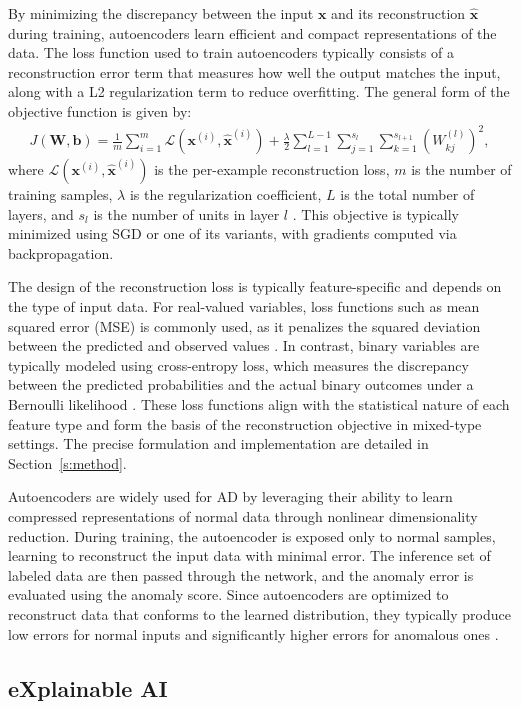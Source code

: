 By minimizing the discrepancy between the input $\mathbf{x}$ and its reconstruction $\hat{\mathbf{x}}$ during training, autoencoders learn efficient and compact representations of the data. The loss function used to train autoencoders typically consists of a reconstruction error term that measures how well the output matches the input, along with a L2 regularization term to reduce overfitting. The general form of the objective function is given by:
\begin{align} \label{eq:loss_func}
J(\mathbf{W}, \mathbf{b}) = \frac{1}{m} \sum_{i=1}^{m} \mathcal{L}(\mathbf{x}^{(i)}, \hat{\mathbf{x}}^{(i)}) + \frac{\lambda}{2} \sum_{l=1}^{L-1} \sum_{j=1}^{s_l} \sum_{k=1}^{s_{l+1}} \left( W_{kj}^{(l)} \right)^2,
\end{align}
where $\mathcal{L}(\mathbf{x}^{(i)}, \hat{\mathbf{x}}^{(i)})$ is the per-example reconstruction loss, $m$ is the number of training samples, $\lambda$ is the regularization coefficient, $L$ is the total number of layers, and $s_l$ is the number of units in layer $l$ \citep{sakurada2014anomaly}. This objective is typically minimized using SGD or one of its variants, with gradients computed via backpropagation.

The design of the reconstruction loss is typically feature-specific and depends on the type of input data. For real-valued variables, loss functions such as mean squared error (MSE) is commonly used, as it penalizes the squared deviation between the predicted and observed values \citep{sakurada2014anomaly}. In contrast, binary variables are typically modeled using cross-entropy loss, which measures the discrepancy between the predicted probabilities and the actual binary outcomes under a Bernoulli likelihood \citep{hinton2006reducing}. These loss functions align with the statistical nature of each feature type and form the basis of the reconstruction objective in mixed-type settings. The precise formulation and implementation are detailed in Section~\ref{s:method}.

Autoencoders are widely used for AD by leveraging their ability to learn compressed representations of normal data through nonlinear dimensionality reduction. During training, the autoencoder is exposed only to normal samples, learning to reconstruct the input data with minimal error. The inference set of labeled data are then passed through the network, and the anomaly error is evaluated using the anomaly score. Since autoencoders are optimized to reconstruct data that conforms to the learned distribution, they typically produce low errors for normal inputs and significantly higher errors for anomalous ones \citep{sakurada2014anomaly}.

\subsection{eXplainable AI}

\iffalse\begin{itemize}
    \item Theoretical background on SHAP, LIME, and feature attribution methods.
    \item How privacy affects interpretability in DL models.
    \item Why KernelSHAP is chosen and its relevance to DP models.
\end{itemize}\fi